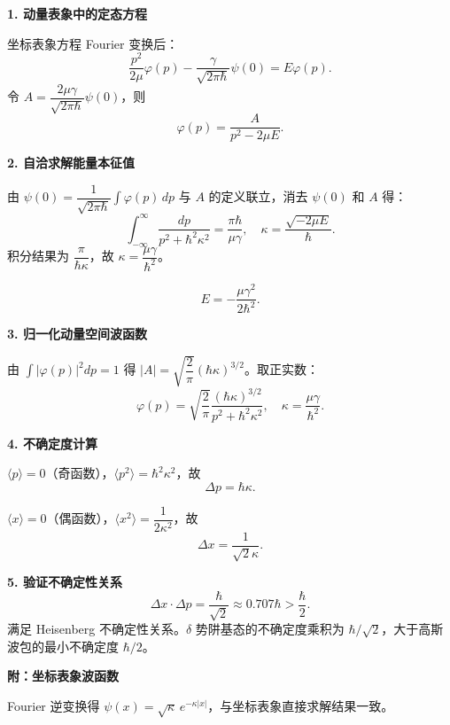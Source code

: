 \begin{derivationbox}[标准解题过程]
\textbf{1. 动量表象中的定态方程}

坐标表象方程 Fourier 变换后：
\[
\frac{p^2}{2\mu}\varphi(p)-\frac{\gamma}{\sqrt{2\pi\hbar}}\psi(0)=E\varphi(p).
\]
令 $A=\dfrac{2\mu\gamma}{\sqrt{2\pi\hbar}}\psi(0)$，则
\[
\varphi(p)=\frac{A}{p^2-2\mu E}.
\]

\textbf{2. 自洽求解能量本征值}

由 $\psi(0)=\dfrac{1}{\sqrt{2\pi\hbar}}\int\varphi(p)\,dp$ 与 $A$ 的定义联立，消去 $\psi(0)$ 和 $A$ 得：
\[
\int_{-\infty}^{\infty}\frac{dp}{p^2+\hbar^2\kappa^2}=\frac{\pi\hbar}{\mu\gamma},\quad\kappa=\frac{\sqrt{-2\mu E}}{\hbar}.
\]
积分结果为 $\dfrac{\pi}{\hbar\kappa}$，故 $\kappa=\dfrac{\mu\gamma}{\hbar^2}$。

\begin{equation}
\boxed{E=-\frac{\mu\gamma^2}{2\hbar^2}.}
\end{equation}

\textbf{3. 归一化动量空间波函数}

由 $\int|\varphi(p)|^2dp=1$ 得 $|A|=\sqrt{\dfrac{2}{\pi}}(\hbar\kappa)^{3/2}$。取正实数：
\begin{equation}
\boxed{\varphi(p)=\sqrt{\frac{2}{\pi}}\frac{(\hbar\kappa)^{3/2}}{p^2+\hbar^2\kappa^2},\quad\kappa=\frac{\mu\gamma}{\hbar^2}.}
\end{equation}

\textbf{4. 不确定度计算}

$\langle p\rangle=0$（奇函数），$\langle p^2\rangle=\hbar^2\kappa^2$，故
\[
\Delta p=\hbar\kappa.
\]

$\langle x\rangle=0$（偶函数），$\langle x^2\rangle=\dfrac{1}{2\kappa^2}$，故
\[
\Delta x=\frac{1}{\sqrt{2}\kappa}.
\]

\textbf{5. 验证不确定性关系}
\begin{equation}
\boxed{\Delta x\cdot\Delta p=\frac{\hbar}{\sqrt{2}}\approx0.707\hbar>\frac{\hbar}{2}.}
\end{equation}
满足 Heisenberg 不确定性关系。$\delta$ 势阱基态的不确定度乘积为 $\hbar/\sqrt{2}$，大于高斯波包的最小不确定度 $\hbar/2$。

\textbf{附：坐标表象波函数}

Fourier 逆变换得 $\psi(x)=\sqrt{\kappa}\,e^{-\kappa|x|}$，与坐标表象直接求解结果一致。
\end{derivationbox}

